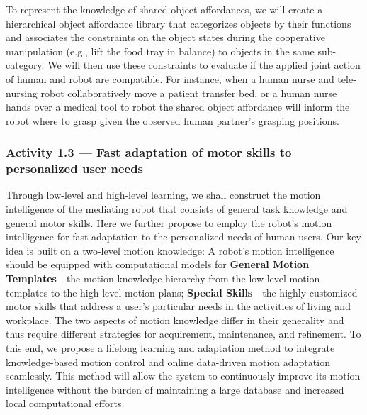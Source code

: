 \documentclass[letterpaper, 11 pt, onecolumn]{article}
\begin{document}
To represent the knowledge of shared object affordances, we will create a hierarchical object affordance library that categorizes objects by their functions and associates the constraints on the object states during the cooperative manipulation (e.g., lift the food tray in balance) 
to objects in the same sub-category. We will then use these constraints to evaluate if the applied joint action of human and robot are compatible. For instance, when a human nurse and tele-nursing robot collaboratively move a patient transfer bed, or a human nurse hands over a medical tool to robot the shared object affordance will inform the robot where to grasp given the observed human partner's grasping positions.

\subsubsection{Activity 1.3 --- Fast adaptation of motor skills to personalized user needs}\label{sec:plan-motion-high}
Through low-level and high-level learning, we shall construct the motion intelligence of the mediating robot that consists of general task knowledge and general motor skills. Here we further propose to %
employ the robot's motion intelligence for fast adaptation to the personalized needs of human users. Our key idea is built on a two-level motion knowledge: A robot's motion intelligence should be equipped with computational models for \textbf{General Motion Templates}---the motion knowledge hierarchy from the low-level motion templates to the high-level motion plans; \textbf{Special Skills}---the highly customized motor skills that address a user's particular needs in the activities of living and workplace. The two aspects of motion knowledge differ in their generality and thus require different strategies for acquirement, maintenance, and refinement. To this end, we propose a lifelong learning and adaptation method to integrate knowledge-based motion control and online data-driven motion adaptation seamlessly. This method will allow the system to continuously improve its motion intelligence without the burden of maintaining a large database and increased local computational efforts. 
\end{document}
